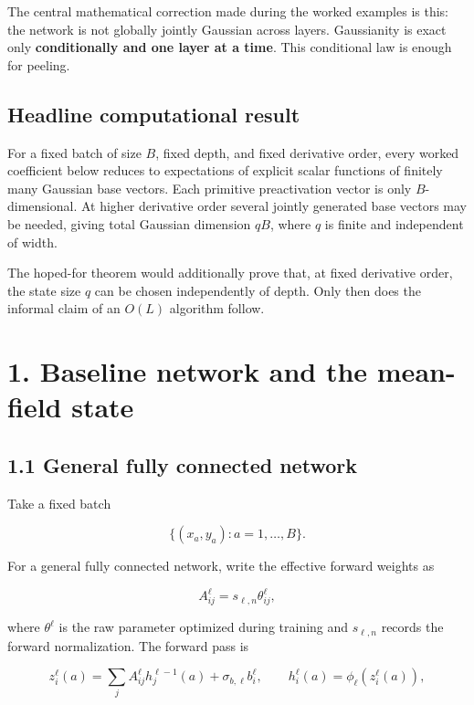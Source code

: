 The central mathematical correction made during the worked examples is this:
the network is not globally jointly Gaussian across layers. Gaussianity is
exact only \textbf{conditionally and one layer at a time}. This conditional law is
enough for peeling.

\subsection*{Headline computational result}


For a fixed batch of size \(B\), fixed depth, and fixed derivative order, every
worked coefficient below reduces to expectations of explicit scalar functions
of finitely many Gaussian base vectors. Each primitive preactivation vector is
only \(B\)-dimensional. At higher derivative order several jointly generated
base vectors may be needed, giving total Gaussian dimension \(qB\), where
\(q\) is finite and independent of width.

The hoped-for theorem would additionally prove that, at fixed derivative
order, the state size \(q\) can be chosen independently of depth. Only then
does the informal claim of an \(O(L)\) algorithm follow.

\section*{1. Baseline network and the mean-field state}


\subsection*{1.1 General fully connected network}


Take a fixed batch

\[
\{(x_a,y_a):a=1,\ldots,B\}.
\]


For a general fully connected network, write the effective forward weights as

\[
A^\ell_{ij}=s_{\ell,n}\theta^\ell_{ij},
\]


where \(\theta^\ell\) is the raw parameter optimized during training and
\(s_{\ell,n}\) records the forward normalization. The forward pass is

\[
z_i^\ell(a)
=
\sum_j A^\ell_{ij}h_j^{\ell-1}(a)
+\sigma_{b,\ell}b_i^\ell,
\qquad
h_i^\ell(a)=\phi_\ell(z_i^\ell(a)),
\]


